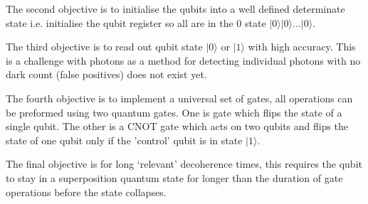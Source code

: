 The second objective is to initialise the qubits into a well defined determinate state i.e. initialise the qubit register so all are in the 0 state $\vert 0\rangle \vert 0\rangle$...$\vert 0 \rangle$. \cite{lapierre_divincenzo_2021}
\vspace{1em}

The third objective is to read out qubit state $\vert 0\rangle$ or $\vert 1 \rangle$ with high accuracy. 
This is a challenge with photons as a method for detecting individual photons with no dark count (false positives) does not exist yet.
\vspace{1em}

The fourth objective is to implement a universal set of gates, all operations can be preformed using two quantum gates.
One is gate which flips the state of a single qubit. The other is a CNOT gate which acts on two qubits and flips the state of one qubit only if the 'control' qubit is in state $\vert 1 \rangle$. \cite{lapierre_divincenzo_2021} 
\vspace{1em}

The final objective is for long `relevant' decoherence times, this requires the qubit to stay in a superposition quantum state for longer than the duration of gate operations before the state collapses. 
